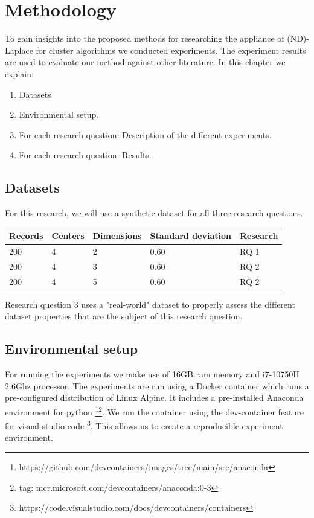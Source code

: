 \chapter{Methodology}

To gain insights into the proposed methods for researching the appliance of (ND)-Laplace for cluster algorithms we conducted experiments.
The experiment results are used to evaluate our method against other literature.
In this chapter we explain:
\begin{enumerate}

  \item Datasets
  \item Environmental setup.
  \item For each research question: Description of the different experiments.
  \item For each research question: Results.
\end{enumerate}

\section{Datasets}
For this research, we will use a synthetic dataset for all three research questions.
\begin{table}[h]
  \begin{tabular}{@{}lllll@{}}
    \toprule
    Records & Centers & Dimensions & Standard deviation & Research \\ \midrule
    200     & 4       & 2          & 0.60               & RQ 1     \\ \bottomrule
    200     & 4       & 3          & 0.60               & RQ 2     \\ \bottomrule
    200     & 4       & 5          & 0.60               & RQ 2     \\ \bottomrule
  \end{tabular}
\end{table}

Research question 3 uses a "real-world" dataset to properly assess the different dataset properties that are the subject of this research question.
\section{Environmental setup}
For running the experiments we make use of 16GB ram memory and i7-10750H 2.6Ghz processor.
The experiments are run using a Docker container which runs a pre-configured distribution of Linux Alpine.
It includes a pre-installed Anaconda environment for python \footnote{https://github.com/devcontainers/images/tree/main/src/anaconda}\footnote{tag: mcr.microsoft.com/devcontainers/anaconda:0-3}.
We run the container using the dev-container feature for visual-studio code \footnote{https://code.visualstudio.com/docs/devcontainers/containers}.
This allows us to create a reproducible experiment environment.

